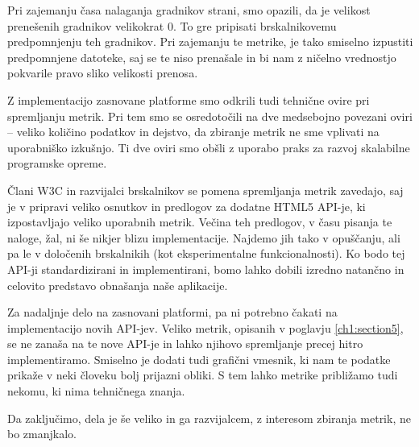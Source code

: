 \documentclass[a4paper, 12pt]{book}
\begin{document}
Pri zajemanju časa nalaganja gradnikov strani, smo opazili, da je velikost prenešenih gradnikov velikokrat 0. To gre pripisati brskalnikovemu predpomnjenju teh gradnikov. Pri zajemanju te metrike, je tako smiselno izpustiti predpomnjene datoteke, saj se te niso prenašale in bi nam z ničelno vrednostjo pokvarile pravo sliko velikosti prenosa.

Z implementacijo zasnovane platforme smo odkrili tudi tehnične ovire pri spremljanju metrik. Pri tem smo se osredotočili na dve medsebojno povezani oviri -- veliko količino podatkov in dejstvo, da zbiranje metrik ne sme vplivati na uporabniško izkušnjo. Ti dve oviri smo obšli z uporabo praks za razvoj skalabilne programske opreme.

Člani W3C in razvijalci brskalnikov se pomena spremljanja metrik zavedajo, saj je v pripravi veliko osnutkov in predlogov za dodatne HTML5 API-je, ki izpostavljajo veliko uporabnih metrik. Večina teh predlogov, v času pisanja te naloge, žal, ni še nikjer blizu implementacije. Najdemo jih tako v opuščanju, ali pa le v določenih brskalnikih (kot eksperimentalne funkcionalnosti). Ko bodo tej API-ji standardizirani in implementirani, bomo lahko dobili izredno natančno in celovito predstavo obnašanja naše aplikacije.

Za nadaljnje delo na zasnovani platformi, pa ni potrebno čakati na implementacijo novih API-jev. Veliko metrik, opisanih v poglavju \ref{ch1:section5}, se ne zanaša na te nove API-je in lahko njihovo spremljanje precej hitro implementiramo. Smiselno je dodati tudi grafični vmesnik, ki nam te podatke prikaže v neki človeku bolj prijazni obliki. S tem lahko metrike približamo tudi nekomu, ki nima tehničnega znanja.

Da zaključimo, dela je še veliko in ga razvijalcem, z interesom zbiranja metrik, ne bo zmanjkalo.

\newpage %
\ \\
\clearpage
{}


\end{document}
